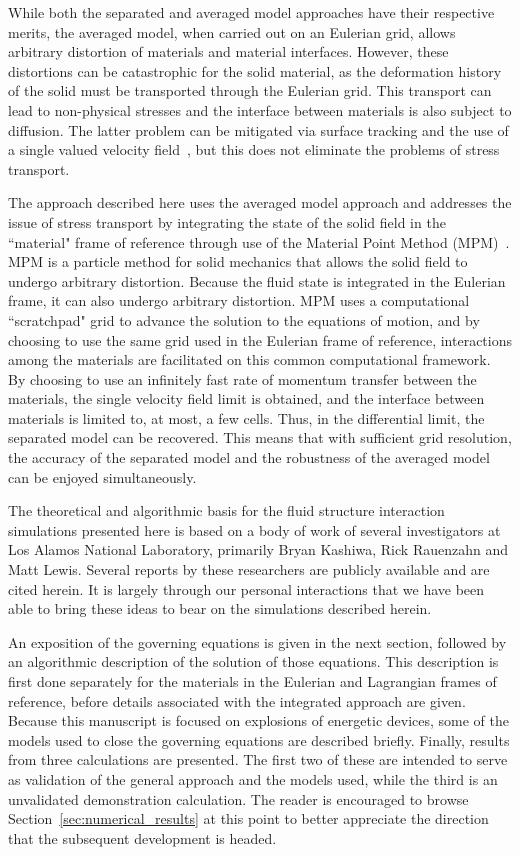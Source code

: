 While both the separated and averaged model approaches have their
respective merits, the averaged model, when carried out on an Eulerian
grid, allows arbitrary distortion of materials and material interfaces.
However, these distortions can be catastrophic for the solid material,
as the deformation history of the solid must be transported through the
Eulerian grid.  This transport can lead to non-physical stresses and the
interface between materials is also subject to diffusion.  The latter problem
can be mitigated via surface tracking and the use of a single valued velocity
field~\cite{benson95,benson98}, but this does not eliminate the problems of
stress transport.

The approach described here uses the averaged model approach and addresses
the issue of stress transport by integrating the state of the solid field in
the ``material" frame of reference through use of the Material Point Method
(MPM)~\cite{sulskycmame,sulskycpc}.  MPM is a particle method for solid
mechanics that allows the solid field to undergo arbitrary distortion.
Because the fluid state is integrated in the Eulerian frame, it can also
undergo arbitrary distortion.  MPM uses a computational ``scratchpad"
grid to advance the solution to the equations of motion, and by choosing
to use the same grid used in the Eulerian frame of reference, interactions
among the materials are facilitated on this common computational framework.
By choosing to use an infinitely fast rate of momentum transfer between the
materials, the single velocity field limit is obtained, and the interface
between materials is limited to, at most, a few cells.  Thus, in the
differential limit, the separated model can be recovered.  This means that
with sufficient grid resolution, the accuracy of the separated model and
the robustness of the averaged model can be enjoyed simultaneously.

The theoretical and algorithmic basis for the fluid structure interaction
simulations presented here is based on a body of work of several investigators
at Los Alamos National Laboratory, primarily Bryan Kashiwa, Rick Rauenzahn and
Matt Lewis.  Several reports by these researchers are publicly available and
are cited herein.  It is largely through our personal interactions that we have
been able to bring these ideas to bear on the simulations described herein.

An exposition of the governing equations is given in the next section,
followed by an algorithmic description of the solution of those equations.
This description is first done separately for the materials in the Eulerian
and Lagrangian frames of reference, before details associated with the
integrated approach are given.  Because this manuscript is focused on
explosions of energetic devices, some of the models used to close the
governing equations are described briefly.  Finally, results from three
calculations are presented.  The first two of these are intended to serve as
validation of the general approach and the models used, while the third is an
unvalidated demonstration calculation.  The reader is encouraged to browse
Section~\ref{sec:numerical_results}  at this point to better appreciate the
direction that the subsequent development is headed.

